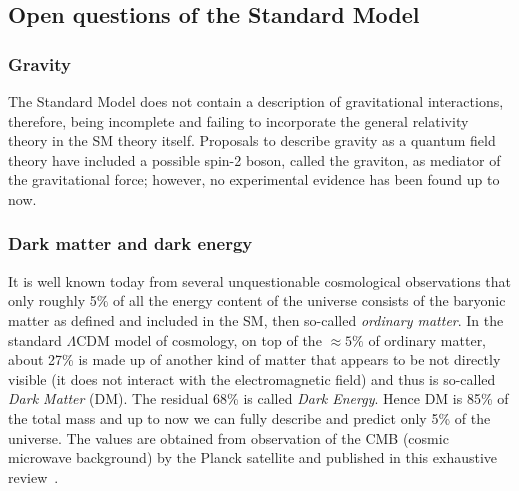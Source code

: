 \subsection{Open questions of the Standard Model}\label{sec:questions}
\subsubsection{Gravity}
The Standard Model does not contain a description of gravitational interactions, therefore, being incomplete and failing to incorporate the general relativity theory in the SM theory itself. Proposals to describe gravity as a quantum field theory have included a possible spin-2 boson, called the graviton, as mediator of the gravitational force; however, no experimental evidence has been found up to now. 

\subsubsection{Dark matter and dark energy}

It is well known today from several unquestionable cosmological observations that only roughly 5$\%$ of all the energy content of the universe consists of the baryonic matter as defined and included in the SM, then so-called \emph{ordinary matter}. In the standard $\Lambda$CDM model of cosmology, on top of the $\approx 5\%$ of ordinary matter, about 27\% is made up of another kind of matter that appears to be not directly visible (it does not interact with the electromagnetic field) and thus is so-called \emph{Dark Matter} (DM). The residual 68\% is called \emph{Dark Energy}. Hence DM is 85\% of the total mass and up to now we can fully describe and predict only 5\% of the universe. The values are obtained from observation of the CMB (cosmic microwave background) by the Planck satellite and published in this exhaustive review~\cite{2020Plank}.

